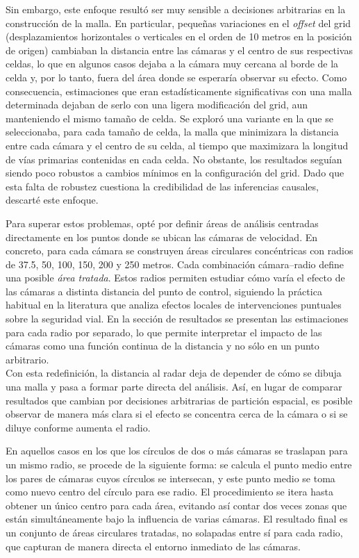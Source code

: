 Sin embargo, este enfoque resultó ser muy sensible a decisiones arbitrarias en la construcción de la malla. En particular, pequeñas variaciones en el \emph{offset} del grid (desplazamientos horizontales o verticales en el orden de 10 metros en la posición de origen) cambiaban la distancia entre las cámaras y el centro de sus respectivas celdas, lo que en algunos casos dejaba a la cámara muy cercana al borde de la celda y, por lo tanto, fuera del área donde se esperaría observar su efecto. Como consecuencia, estimaciones que eran estadísticamente significativas con una malla determinada dejaban de serlo con una ligera modificación del grid, aun manteniendo el mismo tamaño de celda. Se exploró una variante en la que se seleccionaba, para cada tamaño de celda, la malla que minimizara la distancia entre cada cámara y el centro de su celda, al tiempo que maximizara la longitud de vías primarias contenidas en cada celda. No obstante, los resultados seguían siendo poco robustos a cambios mínimos en la configuración del grid. Dado que esta falta de robustez cuestiona la credibilidad de las inferencias causales, descarté este enfoque.

Para superar estos problemas, opté por definir áreas de análisis centradas directamente en los puntos donde se ubican las cámaras de velocidad. En concreto, para cada cámara se construyen áreas circulares concéntricas con radios de 37.5, 50, 100, 150, 200 y 250 metros. Cada combinación cámara--radio define una posible \emph{área tratada}. Estos radios permiten estudiar cómo varía el efecto de las cámaras a distinta distancia del punto de control, siguiendo la práctica habitual en la literatura que analiza efectos locales de intervenciones puntuales sobre la seguridad vial. En la sección de resultados se presentan las estimaciones para cada radio por separado, lo que permite interpretar el impacto de las cámaras como una función continua de la distancia y no sólo en un punto arbitrario.\\

Con esta redefinición, la distancia al radar deja de depender de cómo se dibuja una malla y pasa a formar parte directa del análisis. Así, en lugar de comparar resultados que cambian por decisiones arbitrarias de partición espacial, es posible observar de manera más clara si el efecto se concentra cerca de la cámara o si se diluye conforme aumenta el radio.

En aquellos casos en los que los círculos de dos o más cámaras se traslapan para un mismo radio, se procede de la siguiente forma: se calcula el punto medio entre los pares de cámaras cuyos círculos se intersecan, y este punto medio se toma como nuevo centro del círculo para ese radio. El procedimiento se itera hasta obtener un único centro para cada área, evitando así contar dos veces zonas que están simultáneamente bajo la influencia de varias cámaras. El resultado final es un conjunto de áreas circulares tratadas, no solapadas entre sí para cada radio, que capturan de manera directa el entorno inmediato de las cámaras.\\

